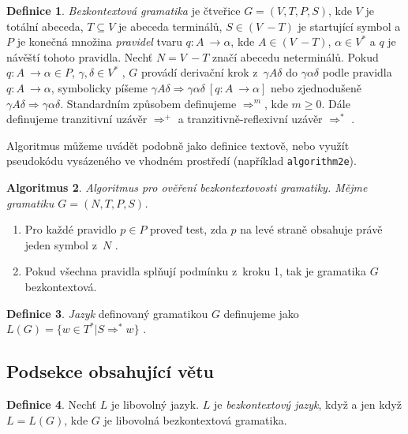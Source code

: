 \documentclass[a4paper,twocolumn,11pt]{article}
\theoremstyle{definition}
\newtheorem{definice}{Definice}[section]
\newtheorem{algoritmus}[definice]{Algoritmus}
\theoremstyle{remark}
\begin{document}
	\begin{definice}\label{def:first}
	\emph{Bezkontextová gramatika} je čtveřice $G = (V,T,P,S)$, kde $V$ je totální abeceda,
	$T \subseteq V$ je abeceda terminálů, $S \in (V~- T)$ je startující symbol a $P$ je konečná množina \emph{pravidel} tvaru $q\colon A~\to \alpha$, kde $A \in (V~- T)$, $\alpha \in V^* $ a $q$ je návěští tohoto pravidla. Nechť $N = V~- T$ značí abecedu neterminálů.
	Pokud $q\colon A~\to \alpha \in P$, $\gamma,\delta \in V^*$ , $G$ provádí derivační krok z~$\gamma A\delta$ do $\gamma\alpha\delta$ podle pravidla $q\colon A~\to \alpha$, symbolicky píšeme 
	$\gamma A\delta \Rightarrow \gamma\alpha\delta \ [q\colon A~\to \alpha] $ nebo zjednodušeně $\gamma A\delta \Rightarrow \gamma\alpha\delta$. Standardním způsobem definujeme $\Rightarrow^m$, kde $m \geq 0$. Dále definujeme 
	tranzitivní uzávěr $\Rightarrow^+$ a tranzitivně-reflexivní uzávěr $\Rightarrow^*$ .
	\end{definice}
	
	Algoritmus můžeme uvádět podobně jako definice textově, nebo využít pseudokódu vysázeného ve vhodném prostředí (například \texttt{algorithm2e}).
	
	\begin{algoritmus}
	\it Algoritmus pro ověření bezkontextovosti gramatiky. Mějme gramatiku $G = (N, T, P, S)$.
	\begin{enumerate}
	\item Pro každé pravidlo $p \in P$ proveď test, zda $p$ na levé straně obsahuje právě jeden symbol z~$N$ .
	\item Pokud všechna pravidla splňují podmínku z~kroku 1, tak je gramatika $G$ bezkontextová.
	\end{enumerate}
	\end{algoritmus}
	
	\begin{definice}
	\textit{Jazyk} definovaný gramatikou $G$ definujeme jako $L(G) = \{w \in T^*|S \Rightarrow^* w\}$ .
	\end{definice}
	
	\subsection{Podsekce obsahující větu}
	
	\begin{definice}
	Nechť $L$ je libovolný jazyk. $L$ je \textit{bezkontextový jazyk}, když a jen když $L = L(G)$, kde $G$ je libovolná bezkontextová gramatika.
	\end{definice}
	
\end{document}
